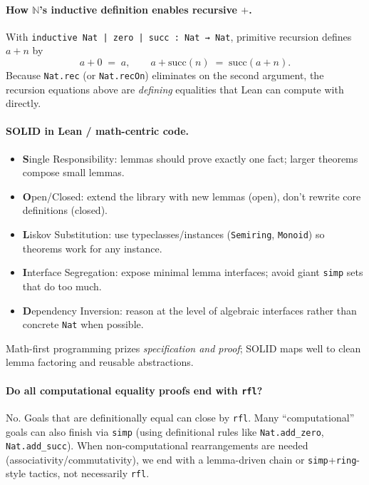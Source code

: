 \documentclass{article}
\theoremstyle{theorem}
\theoremstyle{definition}
\theoremstyle{remark}
\begin{document}
\paragraph{How $\mathbb{N}$’s inductive definition enables recursive $+$.}
With \texttt{inductive Nat | zero | succ : Nat → Nat}, primitive recursion defines $a + n$ by
\[
a + 0 \;=\; a,\qquad a + \mathrm{succ}(n) \;=\; \mathrm{succ}(a+n).
\]
Because \texttt{Nat.rec} (or \texttt{Nat.recOn}) eliminates on the second argument, the recursion equations above are \emph{defining} equalities that Lean can compute with directly.

\paragraph{SOLID in Lean / math-centric code.}
\begin{itemize}
  \item \textbf{S}ingle Responsibility: lemmas should prove exactly one fact; larger theorems compose small lemmas.
  \item \textbf{O}pen/Closed: extend the library with new lemmas (open), don’t rewrite core definitions (closed).
  \item \textbf{L}iskov Substitution: use typeclasses/instances (\texttt{Semiring}, \texttt{Monoid}) so theorems work for any instance.
  \item \textbf{I}nterface Segregation: expose minimal lemma interfaces; avoid giant \texttt{simp} sets that do too much.
  \item \textbf{D}ependency Inversion: reason at the level of algebraic interfaces rather than concrete \texttt{Nat} when possible.
\end{itemize}
Math-first programming prizes \emph{specification and proof}; SOLID maps well to clean lemma factoring and reusable abstractions.

\paragraph{Do all computational equality proofs end with \texttt{rfl}?}
No. Goals that are definitionally equal can close by \texttt{rfl}. Many “computational” goals can also finish via \texttt{simp} (using definitional rules like \texttt{Nat.add\_zero}, \texttt{Nat.add\_succ}). When non-computational rearrangements are needed (associativity/commutativity), we end with a lemma-driven chain or \texttt{simp}+\texttt{ring}-style tactics, not necessarily \texttt{rfl}.
\end{document}

